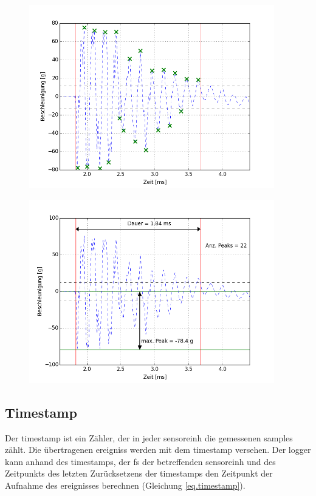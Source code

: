 \begin{figure}
\centering
\begin{minipage}{0.5\textwidth}
\centering
		\includegraphics[width=0.95\textwidth]{images/peaks.png}
	\label{fig.det_peak}
\end{minipage}%
\begin{minipage}{0.5\textwidth}
\centering
		\includegraphics[width=0.95\textwidth]{images/sparse.png}
	\label{fig.det_sparse}
\end{minipage}
\end{figure}



\subsection{Timestamp}\label{subsec.sw_timestamp}
Der \gls{timestamp} ist ein Zähler, der in jeder \gls{sensoreinh} die gemessenen \glspl{sample} zählt. Die übertragenen \glspl{ereignis} werden mit dem \gls{timestamp} versehen. Der \gls{logger} kann anhand des \gls{timestamp}s, der \gls{fs} der betreffenden \gls{sensoreinh} und des Zeitpunkts des letzten Zurücksetzens der \gls{timestamp}s den Zeitpunkt der Aufnahme des \gls{ereignis}ses berechnen (Gleichung \ref{eq.timestamp}).

